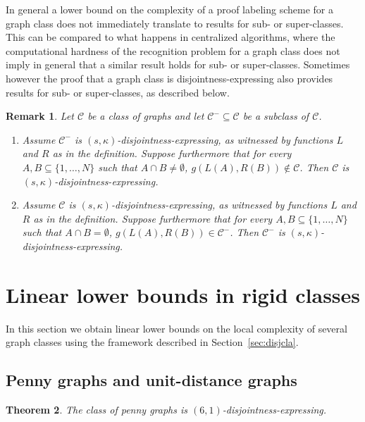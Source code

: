 \documentclass[a4paper,reqno, 12pt]{amsart}
\newtheorem{theorem}{Theorem}[section]
\newtheorem{remark}[theorem]{Remark}
\newcommand{\formerepsilon}{\kappa}
\begin{document}
In general a lower bound on the complexity of a proof
labeling scheme for a graph class does not immediately translate to
results for sub- or super-classes. This can be compared to what happens in
centralized algorithms, where the computational hardness of the
recognition problem
for a graph class does not imply in general that a similar result holds
for sub- or super-classes.
Sometimes however the proof that a graph class is
disjointness-expressing also provides results for sub- or
super-classes, as described below.

\begin{remark}
\label{rmk:disjointness implied by other class}
Let $\mathcal{C}$ be a class of graphs and let $\mathcal{C}^- \subseteq \mathcal{C}$ be a subclass of $\mathcal{C}$.
\begin{enumerate}
\item Assume $\mathcal{C}^-$
 is $(s, \formerepsilon)$-disjointness-expressing, as witnessed by functions $L$ and $R$ as in the definition. Suppose furthermore that for every $A,B\subseteq \{1, \ldots, N\}$ such that $A\cap B \neq \emptyset$, $g(L(A),R(B)) \notin \mathcal{C}$. Then $\mathcal{C}$ is $(s, \formerepsilon)$-disjointness-expressing.\label{item: get bigger class disjointness-expressing}
 \item Assume $\mathcal{C}$
is $(s, \formerepsilon)$-disjointness-expressing, as witnessed by functions $L$ and $R$ as in the definition. Suppose furthermore that for every $A,B\subseteq \{1, \ldots, N\}$ such that $A\cap B = \emptyset$, $g(L(A),R(B)) \in \mathcal{C}^-$. Then $\mathcal{C}^-$ is $(s, \formerepsilon)$-disjointness-expressing.\label{item: get smaller class disjointness-expressing}
 \end{enumerate}
\end{remark}


\section{Linear lower bounds in rigid classes}\label{sec:lb}

In this section we obtain linear lower bounds on the local complexity of several graph classes using the framework described in Section~\ref{sec:disjcla}.

\subsection{Penny graphs and unit-distance graphs}

\begin{theorem}\label{thm:penny}
The class of penny graphs is $(6,1)$-disjointness-expressing.
\end{theorem}
\end{document}
